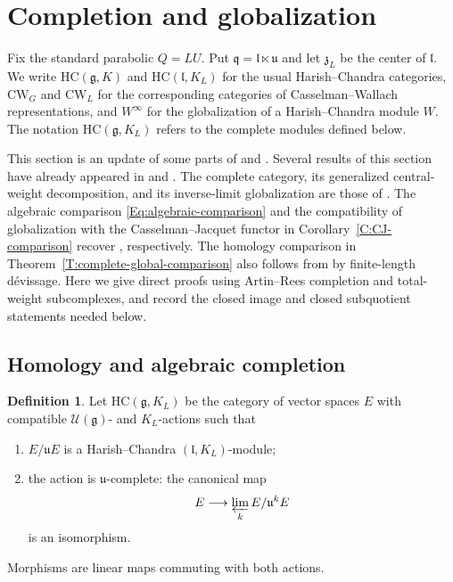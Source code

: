 \documentclass[a4paper,12pt]{amsart}
\numberwithin{equation}{section}
\theoremstyle{plain}
\theoremstyle{definition}
\newtheorem{definition}[theorem]{Definition}
\theoremstyle{remark}
\newcommand{\HC}{\mathrm{HC}}
\begin{document}
\section{Completion and globalization}\label{S:CJ-homology}

Fix the standard parabolic $Q=LU$.
Put $\mathfrak q=\mathfrak l\ltimes\mathfrak u$ and let $\mathfrak z_L$ be the center of $\mathfrak l$.
We write $\HC(\mathfrak g,K)$ and $\HC(\mathfrak l,K_L)$ for the usual Harish--Chandra categories, $\mathrm{CW}_G$ and $\mathrm{CW}_L$ for the corresponding categories of Casselman--Wallach representations, and $W^\infty$ for the globalization of a Harish--Chandra module $W$.
The notation $\HC(\mathfrak g,K_L)$ refers to the complete modules defined below.

This section is an update of some parts of \cite{CWYZ} and \cite{Wu-Yu}. Several results of this section have already appeared in \cite{CWYZ} and \cite[Sections~4--5]{Wu-Yu}.
The complete category, its generalized central-weight decomposition, and its inverse-limit globalization are those of \cite[Definition~4.1, Lemma~4.4, Definition~4.16, and~(4.4)]{Wu-Yu}.
The algebraic comparison \eqref{Eq:algebraic-comparison} and the compatibility of globalization with the Casselman--Jacquet functor in Corollary~\ref{C:CJ-comparison} recover \cite[Propositions~5.2 and~4.18]{Wu-Yu}, respectively.
The homology comparison in Theorem~\ref{T:complete-global-comparison} also follows from \cite[Proposition~4.13 and Theorem~5.3]{Wu-Yu} by finite-length d\'evissage.
Here we give direct proofs using Artin--Rees completion and total-weight subcomplexes, and record the closed image and closed subquotient statements needed below.

\subsection{Homology and algebraic completion}\label{S:algebraic-comparison}

\begin{definition}\label{D:complete}
Let $\HC(\mathfrak g,K_L)$ be the category of vector spaces $E$ with compatible $\mathcal U(\mathfrak g)$- and $K_L$-actions such that
\begin{enumerate}
\item $E/\mathfrak uE$ is a Harish--Chandra $(\mathfrak l,K_L)$-module;
\item the action is $\mathfrak u$-complete: the canonical map
      \[
       E\longrightarrow\varprojlim_k E/\mathfrak u^kE
      \]
      is an isomorphism.
\end{enumerate}
Morphisms are linear maps commuting with both actions.
\end{definition}
\end{document}
